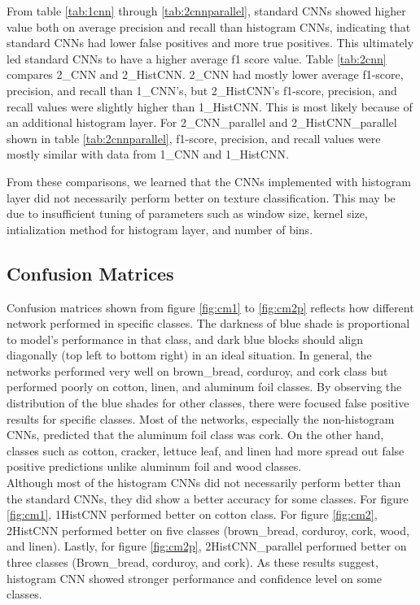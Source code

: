 \documentclass[10pt,twocolumn,letterpaper]{article}
\begin{document}
From table \ref{tab:1cnn} through \ref{tab:2cnnparallel}, standard CNNs showed higher value both on average precision and recall than histogram CNNs, indicating that standard CNNs had lower false positives and more true positives. This ultimately led standard CNNs to have a higher average f1 score value.
Table \ref{tab:2cnn} compares 2\_CNN and 2\_HistCNN. 2\_CNN had mostly lower average f1-score, precision, and recall than 1\_CNN's, but 2\_HistCNN's f1-score, precision, and recall values were slightly higher than 1\_HistCNN. This is most likely because of an additional histogram layer.
For 2\_CNN\_parallel and 2\_HistCNN\_parallel shown in table \ref{tab:2cnnparallel}, f1-score, precision, and recall values were mostly similar with data from 1\_CNN and 1\_HistCNN.

From these comparisons, we learned that the CNNs implemented with histogram layer did not necessarily perform better on texture classification. This may be due to insufficient tuning of parameters such as window size, kernel size, intialization method for histogram layer, and number of bins.


\subsection{Confusion Matrices} %

Confusion matrices shown from figure \ref{fig:cm1} to \ref{fig:cm2p} reflects how different network performed in specific classes. The darkness of blue shade is proportional to model's performance in that class, and dark blue blocks should align diagonally (top left to bottom right) in an ideal situation. In general, the networks performed very well on brown\_bread, corduroy, and cork class but performed poorly on cotton, linen, and aluminum foil classes. By observing the distribution of the blue shades for other classes, there were focused false positive results for specific classes. Most of the networks, especially the non-histogram CNNs, predicted that the aluminum foil class was cork. On the other hand, classes such as cotton, cracker, lettuce leaf, and linen had more spread out false positive predictions unlike aluminum foil and wood classes. \\

Although most of the histogram CNNs did not necessarily perform better than the standard CNNs, they did show a better accuracy for some classes. For figure \ref{fig:cm1}, 1HistCNN performed better on cotton class. For figure \ref{fig:cm2}, 2HistCNN performed better on five classes (brown\_bread, corduroy, cork, wood, and linen). Lastly, for figure \ref{fig:cm2p}, 2HistCNN\_parallel performed better on three classes (Brown\_bread, corduroy, and cork). As these results suggest, histogram CNN showed stronger performance and confidence level on some classes.
\end{document}
